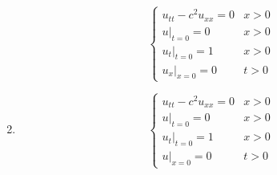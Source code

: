 \documentclass{article}
\theoremstyle{definition}
\newenvironment{boldenv}{\bfseries\boldmath}{}
\begin{document}
\begin{boldenv}
\begin{enumerate}[(1), start=9]
\[\begin{cases}
            u_{tt} - c^2u_{xx} = 0 & x > 0\\
            u|_{t=0} = 0 & x > 0\\
            u_t|_{t=0} = 1 & x > 0\\
            u_x|_{x = 0} = 0 & t > 0
        \end{cases}\]
        \item \[\begin{cases}
            u_{tt} - c^2u_{xx} = 0 & x > 0\\
            u|_{t=0} = 0 & x > 0\\
            u_t|_{t=0} = 1 & x > 0\\
            u|_{x = 0} = 0 & t > 0
        \end{cases}\]
    \end{enumerate}
\end{boldenv}
\end{document}
